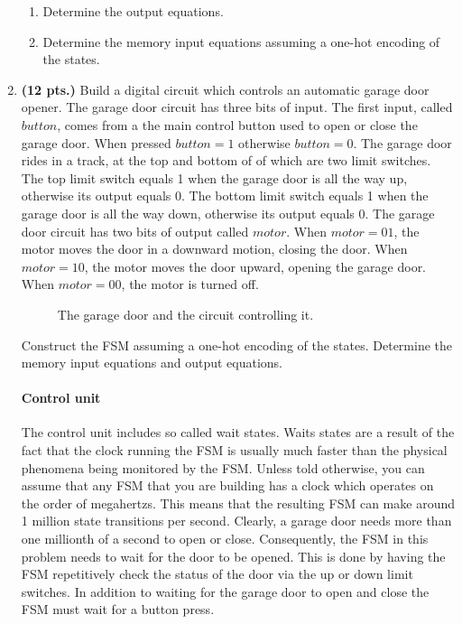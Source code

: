 \begin{enumerate}
\begin{enumerate}
\item Determine the output equations.
\item Determine the memory input equations assuming a one-hot
encoding of the states.
\end{enumerate}


\item {\bf (12 pts.)}
Build a digital circuit which controls an automatic garage door opener.  
The garage door circuit has three bits of input.  The first input, called 
$button$, comes from a the main control button used to open or close the 
garage door.  When pressed $button=1$ otherwise $button=0$.  The garage 
door rides in a track, at the top and bottom of of which are two 
limit switches.  The top limit switch equals 1 when the garage door 
is all the way up, otherwise its output equals 0.  The bottom limit 
switch equals 1 when the garage door is all the way down, otherwise 
its output equals 0.  The garage door circuit has two bits of output 
called $motor$.  When $motor=01$, the motor moves the door in a downward 
motion, closing the door.  When $motor=10$, the motor moves the door 
upward, opening the garage door.  When $motor=00$, the motor is turned off.

\begin{figure}[ht]
\caption{The garage door and the circuit controlling it.}
\label{fig:hwgarage}
\end{figure}

Construct the FSM assuming a one-hot encoding of the states.
Determine the memory input equations and output equations.


\begin{solution} {

\paragraph{Control unit}
The control unit includes so called wait states.  Waits states are
a result of the fact that the clock running the FSM is usually 
much faster than the physical phenomena being monitored by the FSM.
Unless told otherwise, you can assume that any FSM that you are 
building has a clock which operates on the order of megahertzs.
This means that the resulting FSM can make around 1 million 
state transitions per second.  Clearly, a garage door needs more
than one millionth of a second to open or close.  Consequently, 
the FSM in this problem needs to wait for the door to be opened.
This is done by having the FSM repetitively check the status of the
door via the up or down limit switches.  In addition to waiting 
for the garage door to open and close the FSM must wait for a 
button press.

}
\end{solution}
\end{enumerate}
